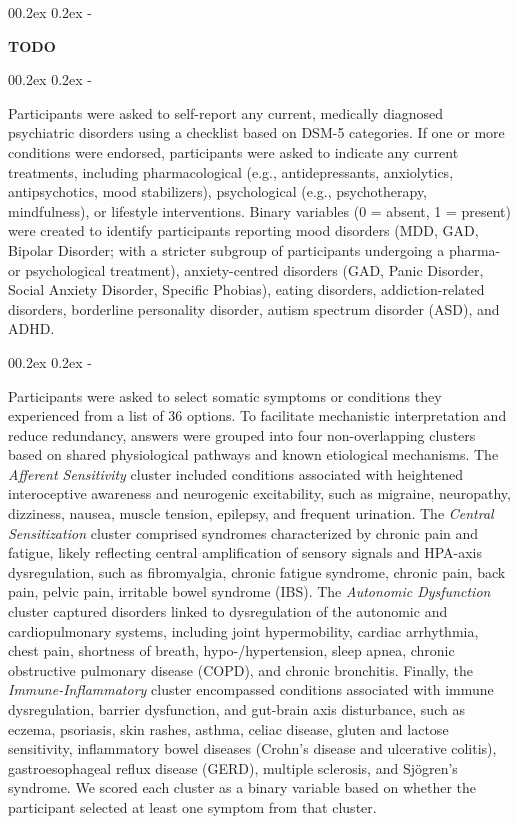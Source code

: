 \documentclass[
  jou,
  floatsintext,
  longtable,
  nolmodern,
  notxfonts,
  notimes,
  colorlinks=true,linkcolor=blue,citecolor=blue,urlcolor=blue]{apa7}
\makeatletter
\renewcommand{\subparagraph}[1]{\@startsection{subparagraph}{5}{0.5em}%
	{0\baselineskip \@plus 0.2ex \@minus 0.2ex}%
	{-\z@\relax}%
	{\normalfont\normalsize\bfseries\itshape\hspace{\parindent}{#1}\textit{\addperi}}{\relax}}
\makeatother
\begin{document}
\subparagraph{Life Satisfaction, Depression and Anxiety
(PHQ-4).}\label{life-satisfaction-depression-and-anxiety-phq-4}

\textbf{TODO}

\subparagraph{Mental Health.}\label{mental-health}

Participants were asked to self-report any current, medically diagnosed
psychiatric disorders using a checklist based on DSM-5 categories. If
one or more conditions were endorsed, participants were asked to
indicate any current treatments, including pharmacological (e.g.,
antidepressants, anxiolytics, antipsychotics, mood stabilizers),
psychological (e.g., psychotherapy, mindfulness), or lifestyle
interventions. Binary variables (0 = absent, 1 = present) were created
to identify participants reporting mood disorders (MDD, GAD, Bipolar
Disorder; with a stricter subgroup of participants undergoing a pharma-
or psychological treatment), anxiety-centred disorders (GAD, Panic
Disorder, Social Anxiety Disorder, Specific Phobias), eating disorders,
addiction-related disorders, borderline personality disorder, autism
spectrum disorder (ASD), and ADHD.

\subparagraph{Somatic Health.}\label{somatic-health}

Participants were asked to select somatic symptoms or conditions they
experienced from a list of 36 options. To facilitate mechanistic
interpretation and reduce redundancy, answers were grouped into four
non-overlapping clusters based on shared physiological pathways and
known etiological mechanisms. The \emph{Afferent Sensitivity} cluster
included conditions associated with heightened interoceptive awareness
and neurogenic excitability, such as migraine, neuropathy, dizziness,
nausea, muscle tension, epilepsy, and frequent urination. The
\emph{Central Sensitization} cluster comprised syndromes characterized
by chronic pain and fatigue, likely reflecting central amplification of
sensory signals and HPA-axis dysregulation, such as fibromyalgia,
chronic fatigue syndrome, chronic pain, back pain, pelvic pain,
irritable bowel syndrome (IBS). The \emph{Autonomic Dysfunction} cluster
captured disorders linked to dysregulation of the autonomic and
cardiopulmonary systems, including joint hypermobility, cardiac
arrhythmia, chest pain, shortness of breath, hypo-/hypertension, sleep
apnea, chronic obstructive pulmonary disease (COPD), and chronic
bronchitis. Finally, the \emph{Immune-Inflammatory} cluster encompassed
conditions associated with immune dysregulation, barrier dysfunction,
and gut-brain axis disturbance, such as eczema, psoriasis, skin rashes,
asthma, celiac disease, gluten and lactose sensitivity, inflammatory
bowel diseases (Crohn's disease and ulcerative colitis),
gastroesophageal reflux disease (GERD), multiple sclerosis, and
Sjögren's syndrome. We scored each cluster as a binary variable based on
whether the participant selected at least one symptom from that cluster.
\end{document}
